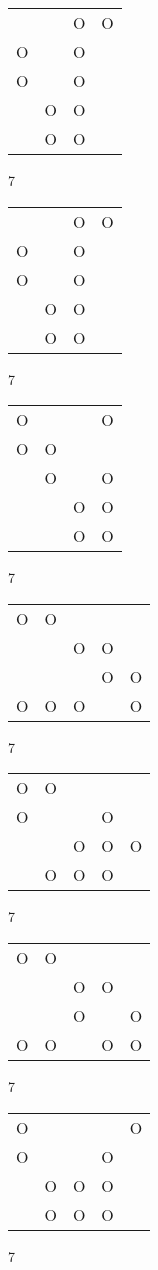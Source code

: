 \begin{tabular}{|m{0.2cm}m{0.2cm}m{0.2cm}m{0.2cm}|}\hline
 & &O&O\\
O& &O& \\
O& &O& \\
 &O&O& \\
 &O&O& \\
\hline\end{tabular}7
\begin{tabular}{|m{0.2cm}m{0.2cm}m{0.2cm}m{0.2cm}|}\hline
 & &O&O\\
O& &O& \\
O& &O& \\
 &O&O& \\
 &O&O& \\
\hline\end{tabular}7
\begin{tabular}{|m{0.2cm}m{0.2cm}m{0.2cm}m{0.2cm}|}\hline
O& & &O\\
O&O& & \\
 &O& &O\\
 & &O&O\\
 & &O&O\\
\hline\end{tabular}7
\begin{tabular}{|m{0.2cm}m{0.2cm}m{0.2cm}m{0.2cm}m{0.2cm}|}\hline
O&O& & & \\
 & &O&O& \\
 & & &O&O\\
O&O&O& &O\\
\hline\end{tabular}7
\begin{tabular}{|m{0.2cm}m{0.2cm}m{0.2cm}m{0.2cm}m{0.2cm}|}\hline
O&O& & & \\
O& & &O& \\
 & &O&O&O\\
 &O&O&O& \\
\hline\end{tabular}7
\begin{tabular}{|m{0.2cm}m{0.2cm}m{0.2cm}m{0.2cm}m{0.2cm}|}\hline
O&O& & & \\
 & &O&O& \\
 & &O& &O\\
O&O& &O&O\\
\hline\end{tabular}7
\begin{tabular}{|m{0.2cm}m{0.2cm}m{0.2cm}m{0.2cm}m{0.2cm}|}\hline
O& & & &O\\
O& & &O& \\
 &O&O&O& \\
 &O&O&O& \\
\hline\end{tabular}7
